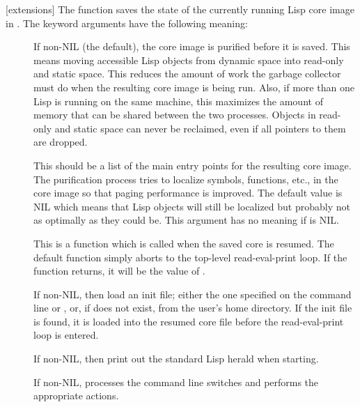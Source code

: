 [extensions]{
       }
The  function saves the state of the currently running Lisp
core image in .  The keyword arguments have the following meaning:
\begin{description}

\item[]
If non-NIL (the default), the core image is purified before it is
saved.  This means moving accessible Lisp objects from dynamic space into
read-only and static space.  This reduces the amount of work the garbage
collector must do when the resulting core image is being run.  Also, if
more than one Lisp is running on the same machine, this maximizes the
amount of memory that can be shared between the two processes.  Objects in
read-only and static space can never be reclaimed, even if all pointers to
them are dropped.

\item[]
This should be a list of the main entry points for
the resulting core image.  The purification process tries to localize
symbols, functions, etc., in the core image so that paging performance
is improved.  The default value is NIL which means that Lisp objects will
still be localized but probably not as optimally as they could be.  This
argument has no meaning if  is NIL.

\item[]
This is a function which is called when the saved core is
resumed.  The default function simply aborts to the top-level read-eval-print
loop.  If the function returns, it will be the value of .

\item[]
If non-NIL, then load an init file; either the one
specified on the command line or , or, if
 does not exist,  from the user's
home directory.  If the init file is found, it is loaded into the resumed core
file before the read-eval-print loop is entered.

\item[]
If non-NIL, then print out the standard Lisp herald when
starting.

\item[]
If non-NIL, processes the command line switches
and performs the appropriate actions.
\end{description}
\enddefun

